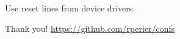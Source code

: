 \documentclass{beamer}
\begin{document}
\begin{frame}{Use reset lines from device drivers}

\end{frame}

\begin{frame}{Thank you!}
	\vfill
	\vfill
	\url{https://github.com/rperier/confs}
\end{frame}
\end{document}
